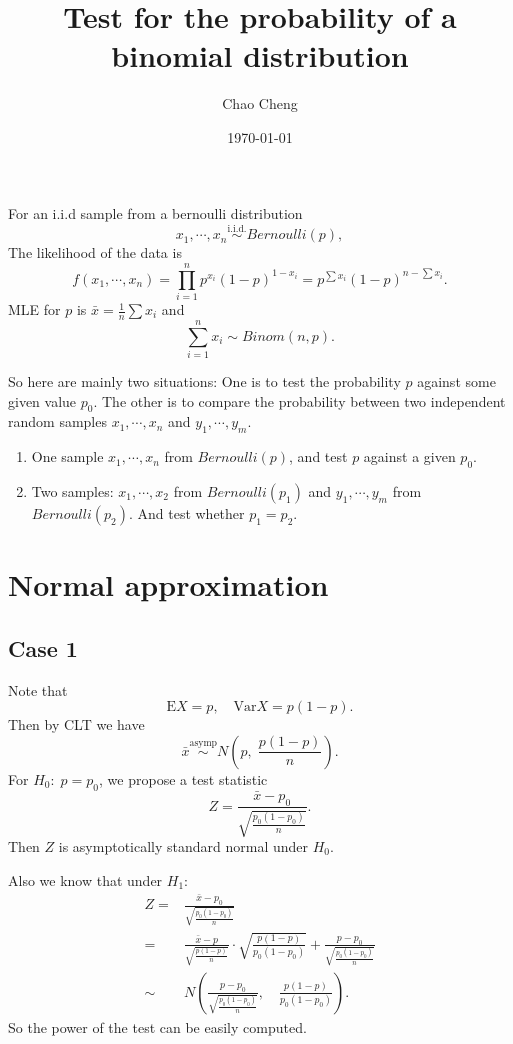 \documentclass[a4paper,12pt]{article}
\title{Test for the probability of a binomial distribution}
\author{Chao Cheng}
\date{\today}
\begin{document}
\maketitle

For an i.i.d sample from a bernoulli distribution
\[
  x_1, \cdots, x_n \overset{\mathrm{i.i.d.}}{\sim} Bernoulli(p)
  ,
\]
The likelihood of the data is
\[
  f\left(x_1, \cdots, x_n\right)
  = \prod\limits_{i = 1}^np^{x_i}\left(1 - p\right)^{1 - x_i}
  = p^{\sum x_i}\left(1 - p\right)^{n - \sum x_i}
  .
\]
MLE for $p$ is $\bar{x} = \frac{1}{n}\sum x_i$ and
\[
  \sum\limits_{i = 1}^nx_i \sim Binom(n, p)
  .
\]

So here are mainly two situations: One is to test the probability $p$ against some given value $p_0$. The other is to compare the probability between two independent random samples $x_1, \cdots, x_n$ and $y_1, \cdots, y_m$.
\begin{enumerate}[label = Case\arabic*:]
\item One sample $x_1, \cdots, x_n$ from $Bernoulli(p)$, and test $p$ against a given $p_0$.
\item Two samples: $x_1, \cdots, x_2$ from $Bernoulli(p_1)$ and $y_1, \cdots, y_m$ from $Bernoulli(p_2)$. And test whether $p_1 = p_2$.
\end{enumerate}

\section{Normal approximation}
\label{sec:normal-approximation}

\subsection{Case 1}
\label{sec:case-1}

Note that
\[
  \mathrm{E}X = p,\quad\mathrm{Var}X = p\left(1 - p\right).
\]
Then by CLT we have
\[
  \bar{x} \overset{\mathrm{asymp}}{\sim} N\left(p,\;\frac{p\left(1 - p\right)}{n}\right)
  .
\]
For $H_0:\;p = p_0$, we propose a test statistic
\[
  Z = \frac{\bar{x} - p_0}{\sqrt{\frac{p_0\left(1 - p_0\right)}{n}}}
  .
\]
Then $Z$ is asymptotically standard normal under $H_0$.
\par
Also we know that under $H_1$:
\[
  \begin{aligned}
    Z =& \frac{\bar{x} - p_0}{\sqrt{\frac{p_0\left(1 - p_0\right)}{n}}}    \\
    =& \frac{\bar{x} - p}{\sqrt{\frac{p\left(1 - p\right)}{n}}}
    \cdot \sqrt{\frac{p\left(1 - p\right)}{p_0\left(1 - p_0\right)}}
    + \frac{p - p_0}{\sqrt{\frac{p_0\left(1 - p_0\right)}{n}}}    \\
    \sim& N\left(
      \frac{p - p_0}{\sqrt{\frac{p_0\left(1 - p_0\right)}{n}}}
      ,\quad
      \frac{p\left(1 - p\right)}{p_0\left(1 - p_0\right)}
    \right)
    .
  \end{aligned}
\]
So the power of the test can be easily computed.
\end{document}
